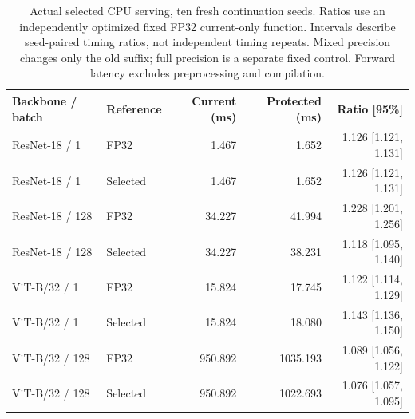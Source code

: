 \begin{table}[t]
\centering
\caption{Actual selected CPU serving, ten fresh continuation seeds. Ratios use an independently optimized fixed FP32 current-only function. Intervals describe seed-paired timing ratios, not independent timing repeats. Mixed precision changes only the old suffix; full precision is a separate fixed control. Forward latency excludes preprocessing and compilation.}
\label{tab:served_frontier}
\begin{tabular}{llrrr}
\toprule
Backbone / batch & Reference & Current (ms) & Protected (ms) & Ratio [95\%] \\
\midrule
ResNet-18 / 1 & FP32 & 1.467 & 1.652 & 1.126 [1.121, 1.131] \\
ResNet-18 / 1 & Selected & 1.467 & 1.652 & 1.126 [1.121, 1.131] \\
ResNet-18 / 128 & FP32 & 34.227 & 41.994 & 1.228 [1.201, 1.256] \\
ResNet-18 / 128 & Selected & 34.227 & 38.231 & 1.118 [1.095, 1.140] \\
ViT-B/32 / 1 & FP32 & 15.824 & 17.745 & 1.122 [1.114, 1.129] \\
ViT-B/32 / 1 & Selected & 15.824 & 18.080 & 1.143 [1.136, 1.150] \\
ViT-B/32 / 128 & FP32 & 950.892 & 1035.193 & 1.089 [1.056, 1.122] \\
ViT-B/32 / 128 & Selected & 950.892 & 1022.693 & 1.076 [1.057, 1.095] \\
\bottomrule
\end{tabular}
\end{table}

